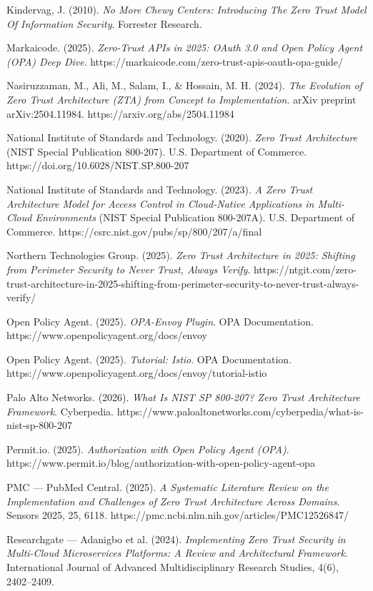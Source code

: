 \documentclass[12pt,a4paper]{article}
\begin{document}
Kindervag, J. (2010). \textit{No More Chewy Centers: Introducing The Zero Trust Model Of Information Security}. Forrester Research.

Markaicode. (2025). \textit{Zero-Trust APIs in 2025: OAuth 3.0 and Open Policy Agent (OPA) Deep Dive}. https://markaicode.com/zero-trust-apis-oauth-opa-guide/

Nasiruzzaman, M., Ali, M., Salam, I., \& Hossain, M. H. (2024). \textit{The Evolution of Zero Trust Architecture (ZTA) from Concept to Implementation}. arXiv preprint arXiv:2504.11984. https://arxiv.org/abs/2504.11984

National Institute of Standards and Technology. (2020). \textit{Zero Trust Architecture} (NIST Special Publication 800-207). U.S. Department of Commerce. https://doi.org/10.6028/NIST.SP.800-207

National Institute of Standards and Technology. (2023). \textit{A Zero Trust Architecture Model for Access Control in Cloud-Native Applications in Multi-Cloud Environments} (NIST Special Publication 800-207A). U.S. Department of Commerce. https://csrc.nist.gov/pubs/sp/800/207/a/final

Northern Technologies Group. (2025). \textit{Zero Trust Architecture in 2025: Shifting from Perimeter Security to Never Trust, Always Verify}. https://ntgit.com/zero-trust-architecture-in-2025-shifting-from-perimeter-security-to-never-trust-always-verify/

Open Policy Agent. (2025). \textit{OPA-Envoy Plugin}. OPA Documentation. https://www.openpolicyagent.org/docs/envoy

Open Policy Agent. (2025). \textit{Tutorial: Istio}. OPA Documentation. https://www.openpolicyagent.org/docs/envoy/tutorial-istio

Palo Alto Networks. (2026). \textit{What Is NIST SP 800-207? Zero Trust Architecture Framework}. Cyberpedia. https://www.paloaltonetworks.com/cyberpedia/what-is-nist-sp-800-207

Permit.io. (2025). \textit{Authorization with Open Policy Agent (OPA)}. https://www.permit.io/blog/authorization-with-open-policy-agent-opa

PMC — PubMed Central. (2025). \textit{A Systematic Literature Review on the Implementation and Challenges of Zero Trust Architecture Across Domains}. Sensors 2025, 25, 6118. https://pmc.ncbi.nlm.nih.gov/articles/PMC12526847/

Researchgate — Adanigbo et al. (2024). \textit{Implementing Zero Trust Security in Multi-Cloud Microservices Platforms: A Review and Architectural Framework}. International Journal of Advanced Multidisciplinary Research Studies, 4(6), 2402–2409.
\end{document}
